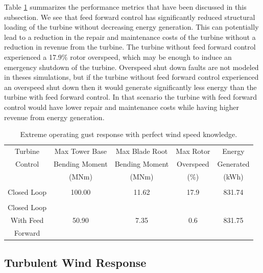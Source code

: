 Table \ref{Table3-1} summarizes the performance metrics that have been discussed in this subsection. We see that feed forward control has significantly reduced structural loading of the turbine without decreasing energy generation. This can potentially lead to a reduction in the repair and maintenance costs of the turbine without a reduction in revenue from the turbine. The turbine without feed forward control experienced a 17.9$\%$ rotor overspeed, which may be enough to induce an emergency shutdown of the turbine. Overspeed shut down faults are not modeled in theses simulations, but if the turbine without feed forward control experienced an overspeed shut down then it would generate significantly less energy than the turbine with feed forward control. In that scenario the turbine with feed forward control would have lower repair and maintenance costs while having higher revenue from energy generation.

\begin{table}
\centering
\begin{tabular}{ c | c c c c }
\hline
\hline
Turbine			& Max Tower	Base		& Max Blade	Root		& Max Rotor				& Energy\\
Control			& Bending Moment		& Bending Moment		& Overspeed					& Generated\\
					& (MNm)  				& (MNm)				& ($\%$)	& (kWh)\\
\hline
  &  &   &  &  \\
Closed Loop  & 100.00 & 11.62  &17.9 & 831.74 \\
 &  &   &  & \\
Closed Loop  &  &   &  &  \\
With Feed  & 50.90 & 7.35  & 0.6 & 831.75 \\
Forward  &  &   &  &  \\
\hline
\hline
\end{tabular}
\caption{Extreme operating gust response with perfect wind speed knowledge.}
\label{Table3-1}
\end{table}

\subsection{Turbulent Wind Response} \label{section3-4-2}

